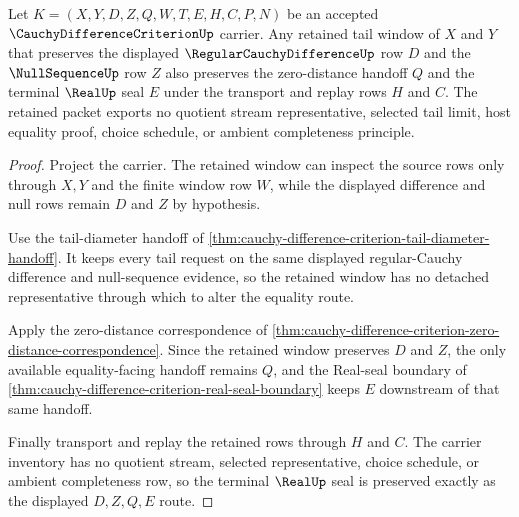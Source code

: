 \begin{theorem}
\label{thm:cauchy-difference-criterion-regular-tail-stability}
Let $K=(X,Y,D,Z,Q,W,T,E,H,C,P,N)$ be an accepted $\CauchyDifferenceCriterionUp$ carrier. Any retained tail window of $X$ and $Y$ that preserves the displayed $\RegularCauchyDifferenceUp$ row $D$ and the $\NullSequenceUp$ row $Z$ also preserves the zero-distance handoff $Q$ and the terminal $\RealUp$ seal $E$ under the transport and replay rows $H$ and $C$. The retained packet exports no quotient stream representative, selected tail limit, host equality proof, choice schedule, or ambient completeness principle.
\end{theorem}
\begin{proof}
Project the carrier. The retained window can inspect the source rows only through $X,Y$ and the finite window row $W$, while the displayed difference and null rows remain $D$ and $Z$ by hypothesis.

Use the tail-diameter handoff of \autoref{thm:cauchy-difference-criterion-tail-diameter-handoff}. It keeps every tail request on the same displayed regular-Cauchy difference and null-sequence evidence, so the retained window has no detached representative through which to alter the equality route.

Apply the zero-distance correspondence of \autoref{thm:cauchy-difference-criterion-zero-distance-correspondence}. Since the retained window preserves $D$ and $Z$, the only available equality-facing handoff remains $Q$, and the Real-seal boundary of \autoref{thm:cauchy-difference-criterion-real-seal-boundary} keeps $E$ downstream of that same handoff.

Finally transport and replay the retained rows through $H$ and $C$. The carrier inventory has no quotient stream, selected representative, choice schedule, or ambient completeness row, so the terminal $\RealUp$ seal is preserved exactly as the displayed $D,Z,Q,E$ route.
\end{proof}

